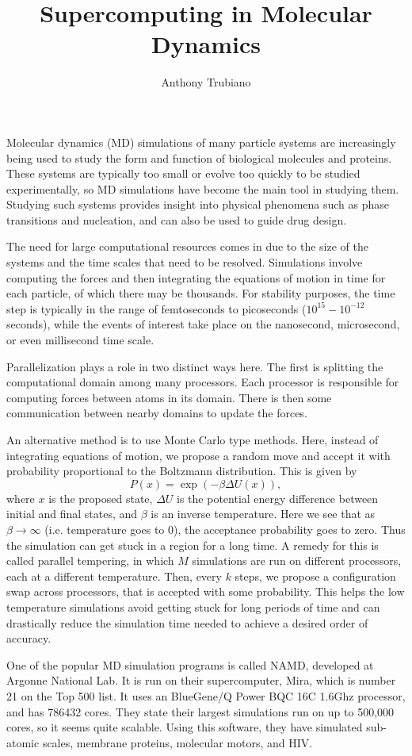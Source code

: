 \documentclass[]{article}
\title{Supercomputing in Molecular Dynamics}
\author{Anthony Trubiano}
\date{}
\begin{document}
\maketitle

Molecular dynamics (MD) simulations of many particle systems are increasingly being used to study the form and function of biological molecules and proteins. These systems are typically too small or evolve too quickly to be studied experimentally, so MD simulations have become the main tool in studying them. Studying such systems provides insight into physical phenomena such as phase transitions and nucleation, and can also be used to guide drug design. 

The need for large computational resources comes in due to the size of the systems and the time scales that need to be resolved. Simulations involve computing the forces and then integrating the equations of motion in time for each particle, of which there may be thousands. For stability purposes, the time step is typically in the range of femtoseconds to picoseconds ($10^{15}-10^{-12}$ seconds), while the events of interest take place on the nanosecond, microsecond, or even millisecond time scale. 

Parallelization plays a role in two distinct ways here. The first is splitting the computational domain among many processors. Each processor is responsible for computing forces between atoms in its domain. There is then some communication between nearby domains to update the forces. 

An alternative method is to use Monte Carlo type methods. Here, instead of integrating equations of motion, we propose a random move and accept it with probability proportional to the Boltzmann distribution. This is given by
$$P(x) = \exp(-\beta \Delta U(x)),$$
where $x$ is the proposed state, $\Delta U$ is the potential energy difference between initial and final states, and $\beta$ is an inverse temperature. Here we see that as $\beta\rightarrow \infty$ (i.e. temperature goes to $0$), the acceptance probability goes to zero. Thus the simulation can get stuck in a region for a long time. A remedy for this is called parallel tempering, in which $M$ simulations are run on different processors, each at a different temperature. Then, every $k$ steps, we propose a configuration swap across processors, that is accepted with some probability. This helps the low temperature simulations avoid getting stuck for long periods of time and can drastically reduce the simulation time needed to achieve a desired order of accuracy. 

One of the popular MD simulation programs is called NAMD, developed at Argonne National Lab. It is run on their supercomputer, Mira, which is number 21 on the Top 500 list. It uses an BlueGene/Q Power BQC 16C 1.6Ghz  processor, and has 786432 cores. They state their largest simulations run on up to 500,000 cores, so it seems quite scalable. Using this software, they have simulated sub-atomic scales, membrane proteins, molecular motors, and HIV. 
\end{document}
